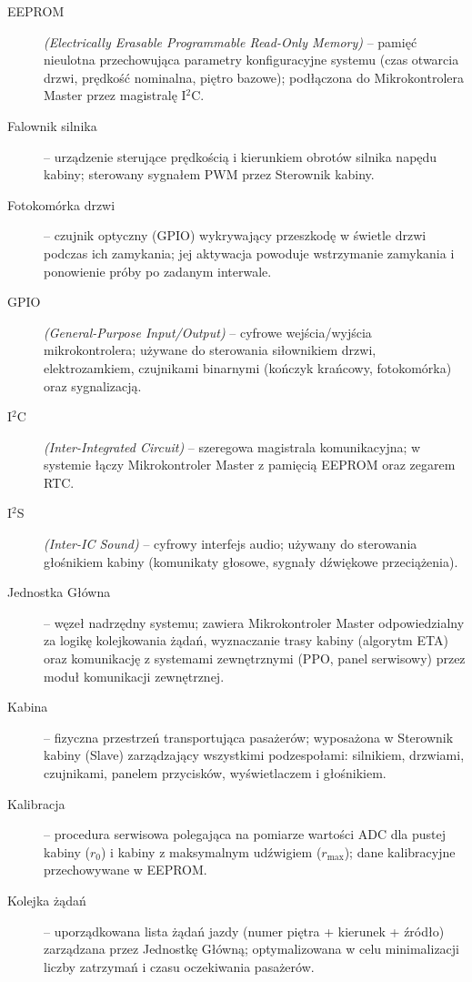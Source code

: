 \documentclass{article}
\begin{document}
\begin{description}
  \item[EEPROM] \textit{(Electrically Erasable Programmable Read-Only Memory)} – pamięć nieulotna przechowująca parametry konfiguracyjne systemu (czas otwarcia drzwi, prędkość nominalna, piętro bazowe); podłączona do Mikrokontrolera Master przez magistralę I$^2$C.

  \item[Falownik silnika] – urządzenie sterujące prędkością i kierunkiem obrotów silnika napędu kabiny; sterowany sygnałem PWM przez Sterownik kabiny.

  \item[Fotokomórka drzwi] – czujnik optyczny (GPIO) wykrywający przeszkodę w świetle drzwi podczas ich zamykania; jej aktywacja powoduje wstrzymanie zamykania i ponowienie próby po zadanym interwale.

  \item[GPIO] \textit{(General-Purpose Input/Output)} – cyfrowe wejścia/wyjścia mikrokontrolera; używane do sterowania siłownikiem drzwi, elektrozamkiem, czujnikami binarnymi (kończyk krańcowy, fotokomórka) oraz sygnalizacją.

  \item[I$^2$C] \textit{(Inter-Integrated Circuit)} – szeregowa magistrala komunikacyjna; w systemie łączy Mikrokontroler Master z pamięcią EEPROM oraz zegarem RTC.

  \item[I$^2$S] \textit{(Inter-IC Sound)} – cyfrowy interfejs audio; używany do sterowania głośnikiem kabiny (komunikaty głosowe, sygnały dźwiękowe przeciążenia).

  \item[Jednostka Główna] – węzeł nadrzędny systemu; zawiera Mikrokontroler Master odpowiedzialny za logikę kolejkowania żądań, wyznaczanie trasy kabiny (algorytm ETA) oraz komunikację z systemami zewnętrznymi (PPO, panel serwisowy) przez moduł komunikacji zewnętrznej.

  \item[Kabina] – fizyczna przestrzeń transportująca pasażerów; wyposażona w Sterownik kabiny (Slave) zarządzający wszystkimi podzespołami: silnikiem, drzwiami, czujnikami, panelem przycisków, wyświetlaczem i głośnikiem.

  \item[Kalibracja] – procedura serwisowa polegająca na pomiarze wartości ADC dla pustej kabiny ($r_0$) i kabiny z maksymalnym udźwigiem ($r_\text{max}$); dane kalibracyjne przechowywane w EEPROM.

  \item[Kolejka żądań] – uporządkowana lista żądań jazdy (numer piętra + kierunek + źródło) zarządzana przez Jednostkę Główną; optymalizowana w celu minimalizacji liczby zatrzymań i czasu oczekiwania pasażerów.


\end{description}
\end{document}
